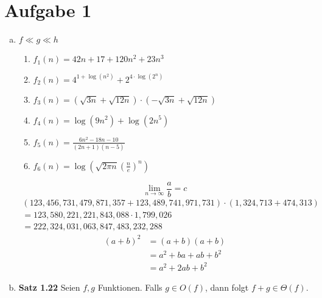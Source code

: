 \documentclass[a4paper,12pt]{scrartcl}
\begin{document}
\section*{Aufgabe 1}
\begin{enumerate}[a)]
	\item $f \ll g \ll h$ %
	\begin{enumerate}[1.]
		\item $f_1(n) = 42n + 17 + 120n^2 + 23n^3$
		\item $f_2(n) = 4^{1 + \log(n^2)} + 2^{4 \cdot \log(2^n)}$
		\item $f_3(n) = \left(\sqrt{3n} + \sqrt{12n}\right) \cdot \left(-\sqrt{3n} + \sqrt{12n}\right)$
		\item $f_4(n) = \log(9n^2) + \log(2n^5)$
		\item $f_5(n) = \frac{6n^2-18n-10}{(2n+1)(n-5)}$
		\item $f_6(n) = \log\left(\sqrt{2 \pi n}\left(\frac{n}{e}\right)^{\!n}\right)$
	\end{enumerate}
	$$
		\lim_{n \to \infty} \frac{a}{b} = c
	$$
	\begin{multline*}
		(123,456,731,479,871,357 + 123,489,741,971,731) \cdot (1,324,713 + 474,313) \\
		= 123,580,221,221,843,088 \cdot 1,799,026 \\
		= 222,324,031,063,847,483,232,288
	\end{multline*}
	\begin{align*}
		(a + b)^2 
		&= (a + b)(a + b) \\
		&= a^2 + ba + ab + b^2 \\
		&= a^2 + 2ab + b^2
	\end{align*}
	\item \textbf{Satz 1.22} Seien $f, g$ Funktionen. Falls $g \in O(f)$, dann folgt $f + g \in \Theta(f)$.
\end{enumerate}
\end{document}
